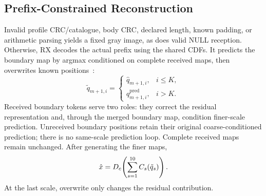 \subsection{Prefix-Constrained Reconstruction}
Invalid profile CRC/catalogue, body CRC, declared length, known padding, or arithmetic parsing yields a fixed gray image, as does valid NULL reception. Otherwise, RX decodes the actual prefix using the shared CDFs. It predicts the boundary map by argmax conditioned on complete received maps, then overwrites known positions~\cite{var}:
\begin{equation}
\tilde q_{m+1,i}=\begin{cases}\hat q_{m+1,i},&i\leq K,\\q^{\mathrm{pred}}_{m+1,i},&i>K.\end{cases}
\label{eq:overwrite}
\end{equation}
Received boundary tokens serve two roles: they correct the residual representation and, through the merged boundary map, condition finer-scale prediction. Unreceived boundary positions retain their original coarse-conditioned prediction; there is no same-scale prediction loop. Complete received maps remain unchanged. After generating the finer maps,
\begin{equation}
\hat x=D_c\!\left(\sum_{s=1}^{10}C_s(\tilde q_s)\right).
\label{eq:reconstruction}
\end{equation}
At the last scale, overwrite only changes the residual contribution.
